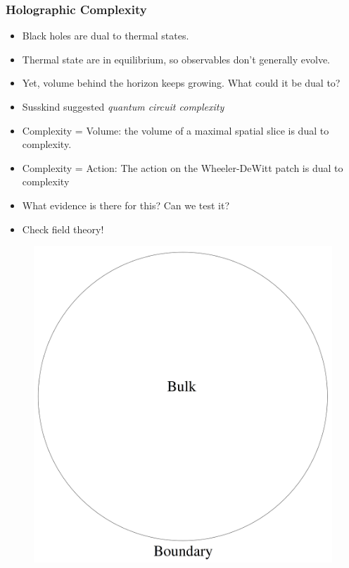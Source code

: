 \documentclass[10pt,aspectratio=169]{beamer}
\begin{document}
\begin{frame}
\frametitle{Holographic Complexity}

\begin{minipage}[t]{0.48\linewidth}

\begin{itemize}

\item Black holes are dual to thermal states.

\item Thermal state are in equilibrium, so observables don't generally evolve.

\item Yet, volume behind the horizon keeps growing. What could it be dual to?

\item Susskind suggested {\it quantum circuit complexity}

\item Complexity = Volume: the volume of a maximal spatial slice is dual to complexity.

\item Complexity = Action: The action on the Wheeler-DeWitt patch is dual to complexity

\item What evidence is there for this? Can we test it? 

\item Check field theory!

\end{itemize}

\end{minipage}
%
\hfill
%
\begin{minipage}[t]{0.48\linewidth}

\begin{figure}
    \begin{center}
    
        \includegraphics[scale=0.06]{adscft}    
    

\end{center}
\end{figure}
\end{minipage}
\end{frame}
\end{document}
